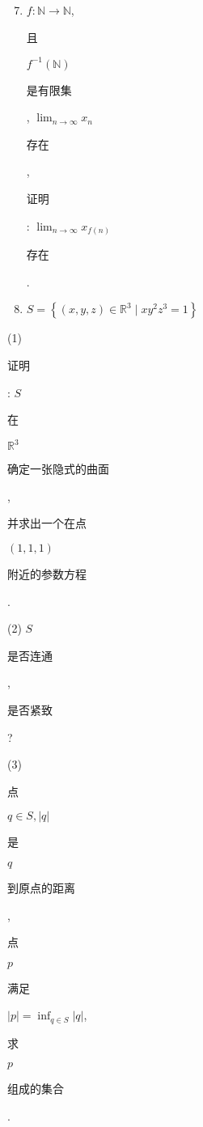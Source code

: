 \documentclass[10pt]{article}
\begin{document}
\begin{enumerate}
  \setcounter{enumi}{6}
  \item $f: \mathbb{N} \rightarrow \mathbb{N}$, \begin{CJK}{UTF8}{mj}且\end{CJK} $f^{-1}(\mathbb{N})$ \begin{CJK}{UTF8}{mj}是有限集\end{CJK}, $\lim _{n \rightarrow \infty} x_{n}$ \begin{CJK}{UTF8}{mj}存在\end{CJK}, \begin{CJK}{UTF8}{mj}证明\end{CJK}: $\lim _{n \rightarrow \infty} x_{f(n)}$ \begin{CJK}{UTF8}{mj}存在\end{CJK}.

  \item $S=\left\{(x, y, z) \in \mathbb{R}^{3} \mid x y^{2} z^{3}=1\right\}$

\end{enumerate}
(1) \begin{CJK}{UTF8}{mj}证明\end{CJK}: $S$ \begin{CJK}{UTF8}{mj}在\end{CJK} $\mathbb{R}^{3}$ \begin{CJK}{UTF8}{mj}确定一张隐式的曲面\end{CJK}, \begin{CJK}{UTF8}{mj}并求出一个在点\end{CJK} $(1,1,1)$ \begin{CJK}{UTF8}{mj}附近的参数方程\end{CJK}.

(2) $S$ \begin{CJK}{UTF8}{mj}是否连通\end{CJK}, \begin{CJK}{UTF8}{mj}是否紧致\end{CJK}?

(3) \begin{CJK}{UTF8}{mj}点\end{CJK} $q \in S,|q|$ \begin{CJK}{UTF8}{mj}是\end{CJK} $q$ \begin{CJK}{UTF8}{mj}到原点的距离\end{CJK}, \begin{CJK}{UTF8}{mj}点\end{CJK} $p$ \begin{CJK}{UTF8}{mj}满足\end{CJK} $|p|=\inf _{q \in S}|q|$, \begin{CJK}{UTF8}{mj}求\end{CJK} $p$ \begin{CJK}{UTF8}{mj}组成的集合\end{CJK}.
\end{document}
